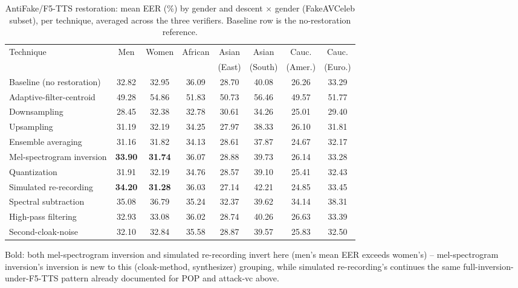 \documentclass[11pt]{article}
\begin{document}
\begin{table}[H]
\centering
\caption{AntiFake/F5-TTS restoration: mean EER (\%) by gender and
descent $\times$ gender (FakeAVCeleb subset), per technique, averaged
across the three verifiers. Baseline row is the no-restoration
reference.}
\label{tab:restoration-antifake-f5tts-demo}
\begin{tabular}{lccccccc}
\toprule
Technique & Men & Women & African & Asian & Asian & Cauc. & Cauc. \\
 & & & & (East) & (South) & (Amer.) & (Euro.) \\
\midrule
Baseline (no restoration) & 32.82 & 32.95 & 36.09 & 28.70 & 40.08 & 26.26 & 33.29 \\
Adaptive-filter-centroid & 49.28 & 54.86 & 51.83 & 50.73 & 56.46 & 49.57 & 51.77 \\
Downsampling & 28.45 & 32.38 & 32.78 & 30.61 & 34.26 & 25.01 & 29.40 \\
Upsampling & 31.19 & 32.19 & 34.25 & 27.97 & 38.33 & 26.10 & 31.81 \\
Ensemble averaging & 31.16 & 31.82 & 34.13 & 28.61 & 37.87 & 24.67 & 32.17 \\
Mel-spectrogram inversion & \textbf{33.90} & \textbf{31.74} & 36.07 & 28.88 & 39.73 & 26.14 & 33.28 \\
Quantization & 31.91 & 32.19 & 34.76 & 28.57 & 39.10 & 25.41 & 32.43 \\
Simulated re-recording & \textbf{34.20} & \textbf{31.28} & 36.03 & 27.14 & 42.21 & 24.85 & 33.45 \\
Spectral subtraction & 35.08 & 36.79 & 35.24 & 32.37 & 39.62 & 34.14 & 38.31 \\
High-pass filtering & 32.93 & 33.08 & 36.02 & 28.74 & 40.26 & 26.63 & 33.39 \\
Second-cloak-noise & 32.10 & 32.84 & 35.58 & 28.87 & 39.57 & 25.83 & 32.50 \\
\bottomrule
\end{tabular}

{\small Bold: both mel-spectrogram inversion and simulated re-recording
invert here (men's mean EER exceeds women's) -- mel-spectrogram
inversion's inversion is new to this (cloak-method, synthesizer)
grouping, while simulated re-recording's continues the same
full-inversion-under-F5-TTS pattern already documented for POP and
attack-vc above.}
\end{table}
\end{document}
